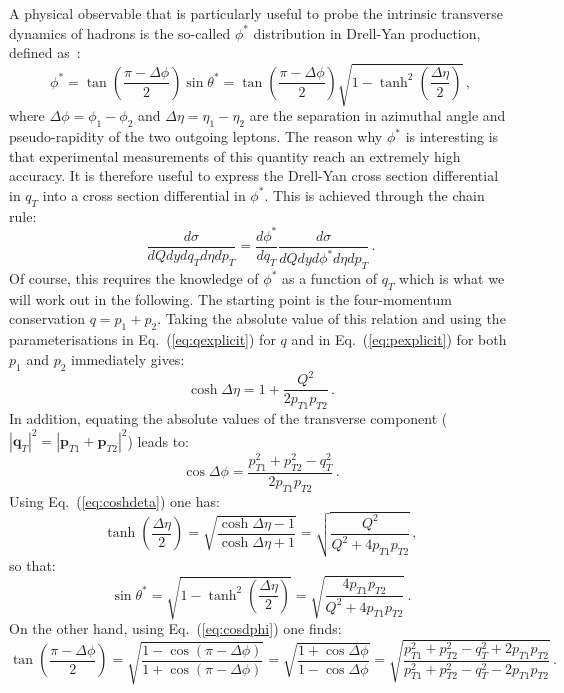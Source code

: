 \documentclass[10pt,a4paper]{article}
\begin{document}
A physical observable that is particularly useful to probe the
intrinsic transverse dynamics of hadrons is the so-called $\phi^*$
distribution in Drell-Yan production, defined as~\cite{Banfi:2010cf}:
\begin{equation}
\phi^*=\tan\left(\frac{\pi-\Delta\phi}{2}\right)\sin\theta^*=\tan\left(\frac{\pi-\Delta\phi}{2}\right)\sqrt{1-\tanh^2\left(\frac{\Delta\eta}{2}\right)}\,,
\end{equation}
where $\Delta\phi = \phi_1-\phi_2$ and $\Delta\eta = \eta_1-\eta_2$
are the separation in azimuthal angle and pseudo-rapidity of the two
outgoing leptons. The reason why $\phi^*$ is interesting is that
experimental measurements of this quantity reach an extremely high
accuracy. It is therefore useful to express the Drell-Yan cross
section differential in $q_T$ into a cross section differential in
$\phi^*$. This is achieved through the chain rule:
\begin{equation}
\frac{d\sigma}{dQdydq_T d\eta dp_T} = \frac{d\phi^*}{dq_T}\frac{d\sigma}{dQdyd\phi^*d\eta dp_T}\,.
\end{equation}
Of course, this requires the knowledge of $\phi^*$ as a function of
$q_T$ which is what we will work out in the following. The starting
point is the four-momentum conservation $q=p_1+p_2$. Taking the
absolute value
of this relation and using the parameterisations in
Eq.~(\ref{eq:qexplicit}) for $q$ and in Eq.~(\ref{eq:pexplicit}) for
both $p_1$ and $p_2$ immediately gives:
\begin{equation}\label{eq:coshdeta}
\cosh\Delta\eta = 1+\frac{Q^2}{2p_{T1}p_{T2}}\,. 
\end{equation}
In addition, equating the absolute values of the transverse component
($|\mathbf{q}_T|^2=|\mathbf{p}_{T1}+\mathbf{p}_{T2}|^2$) leads to:
\begin{equation}\label{eq:cosdphi}
\cos\Delta\phi =\frac{p_{T1}^2+p_{T2}^2-q_T^2}{2p_{T1}p_{T2}}\,.
\end{equation}
Using Eq.~(\ref{eq:coshdeta}) one has:
\begin{equation}
\tanh\left(\frac{\Delta\eta}{2}\right) =
\sqrt{\frac{\cosh\Delta\eta-1}{\cosh\Delta\eta+1}} = \sqrt{\frac{Q^2}{Q^2+4p_{T1}p_{T2}}}\,,
\end{equation}
so that:
\begin{equation}
\sin\theta^*=\sqrt{1-\tanh^2\left(\frac{\Delta\eta}{2}\right)}
=\sqrt{\frac{4p_{T1}p_{T2}}{Q^2 + 4p_{T1}p_{T2}}}\,.
\end{equation}
On the other hand, using Eq.~(\ref{eq:cosdphi}) one finds:
\begin{equation}
\tan\left(\frac{\pi-\Delta\phi}{2}\right) = \sqrt{\frac{1-\cos(\pi-\Delta\phi)}{1+\cos(\pi-\Delta\phi)}}=\sqrt{\frac{1+\cos\Delta\phi}{1-\cos\Delta\phi}}=\sqrt{\frac{p_{T1}^2+p_{T2}^2-q_T^2+2p_{T1}p_{T2}}{p_{T1}^2+p_{T2}^2-q_T^2-2p_{T1}p_{T2}}}\,.
\end{equation}
\end{document}
